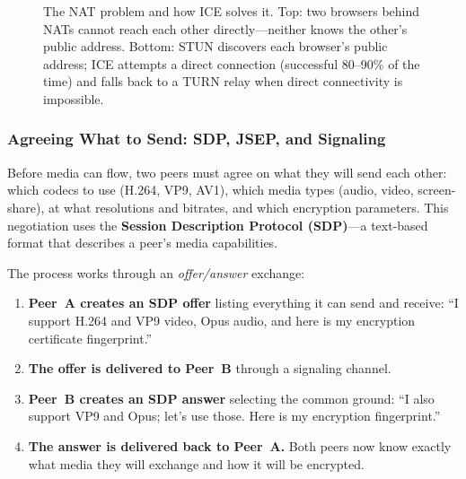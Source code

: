 \documentclass[11pt]{article}
\begin{document}
\begin{figure}[ht]
\caption{The NAT problem and how ICE solves it.  Top: two browsers behind
  NATs cannot reach each other directly---neither knows the other's public
  address.  Bottom: STUN discovers each browser's public address; ICE
  attempts a direct connection (successful 80--90\% of the time) and falls
  back to a TURN relay when direct connectivity is impossible.}
\label{fig:nat-ice}
\end{figure}

\subsubsection{Agreeing What to Send: SDP, JSEP, and Signaling}

Before media can flow, two peers must agree on what they will send each
other: which codecs to use (H.264, VP9, AV1), which media types (audio,
video, screen-share), at what resolutions and bitrates, and which encryption
parameters.  This negotiation uses the \textbf{Session Description Protocol
(SDP)}---a text-based format that describes a peer's media capabilities.

The process works through an \emph{offer/answer} exchange:
\begin{enumerate}
  \item \textbf{Peer~A creates an SDP offer} listing everything it can send
    and receive: ``I support H.264 and VP9 video, Opus audio, and here is my
    encryption certificate fingerprint.''
  \item \textbf{The offer is delivered to Peer~B} through a signaling
    channel.
  \item \textbf{Peer~B creates an SDP answer} selecting the common ground:
    ``I also support VP9 and Opus; let's use those.  Here is my encryption
    fingerprint.''
  \item \textbf{The answer is delivered back to Peer~A.}  Both peers now know
    exactly what media they will exchange and how it will be encrypted.
\end{enumerate}
\end{document}
